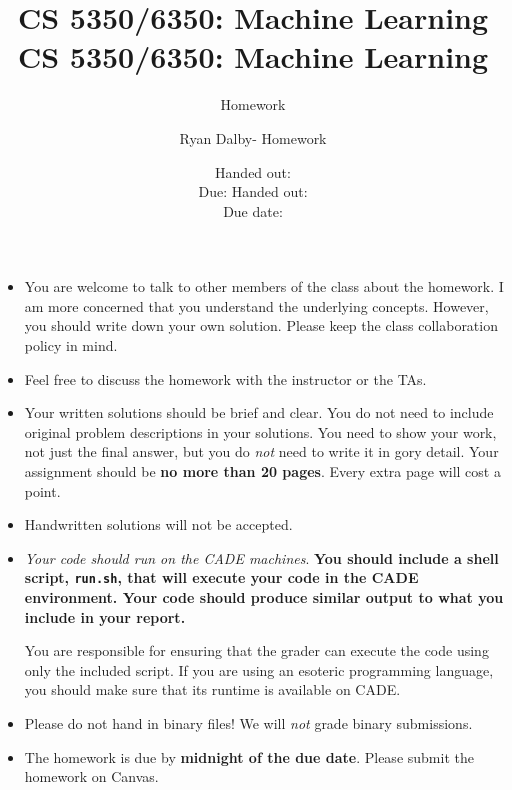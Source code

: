 \documentclass[12pt, fullpage,letterpaper]{article}
\title{CS 5350/6350: Machine Learning \semester}
\author{Homework \assignmentId}
\date{Handed out: \releaseDate\\
	Due: \dueDate}
\title{CS 5350/6350: Machine Learning \semester}
\author{Ryan Dalby- Homework \assignmentId}
\date{Handed out: \releaseDate\\
  Due date: \dueDate}
\begin{document}
\maketitle


\newcommand{\Hcal}{\mathcal{H}} 
{\footnotesize
	\begin{itemize}
		\item You are welcome to talk to other members of the class about
		the homework. I am more concerned that you understand the
		underlying concepts. However, you should write down your own
		solution. Please keep the class collaboration policy in mind.
		
		\item Feel free to discuss the homework with the instructor or the TAs.
		
		\item Your written solutions should be brief and clear. You do not need to include original problem descriptions in your solutions. You need to
		show your work, not just the final answer, but you do \emph{not}
		need to write it in gory detail. Your assignment should be {\bf no
			more than 20 pages}. Every extra page will cost a point.
		
		\item Handwritten solutions will not be accepted.
		
		
		\item {\em Your code should run on the CADE machines}. \textbf{You should
		include a shell script, {\tt run.sh}, that will execute your code
		in the CADE environment. Your code should produce similar output to what you include in your report.}
		
		You are responsible for ensuring that the grader can execute the
		code using only the included script. If you are using an
		esoteric programming language, you should make sure that its
		runtime is available on CADE.
		
		\item Please do not hand in binary files! We will {\em not} grade
		binary submissions.
		
		\item The homework is due by \textbf{midnight of the due date}. Please submit
		the homework on Canvas.
		
	\end{itemize}
}
\end{document}
